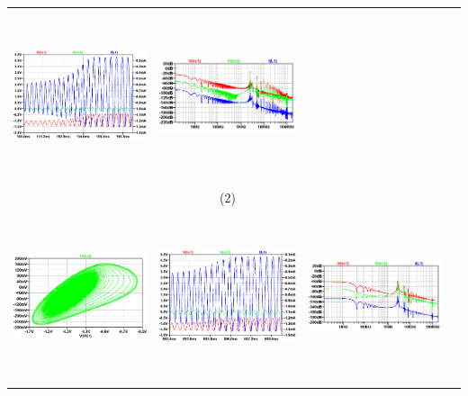 \documentclass{rbf}
\begin{document}
\begin{table}[h]
\begin{tabular}{c c c c}
        \includegraphics[width=5cm,height=5cm]{R7/1379 C 0 720ms time series.png}&
        \includegraphics[width=5cm,height=5cm]{R7/1379 C 0 720ms fft.png}&\\
        & (2) & \\ 
        \includegraphics[width=5cm,height=5cm]{R7/1419 C0 ATRACTOR.png}&
        \includegraphics[width=5cm,height=5cm]{R7/1419 C0 TS.png}&
        \includegraphics[width=5cm,height=5cm]{R7/1419 C0 FFT.png}&\\

\end{tabular}
\end{table}
\end{document}
